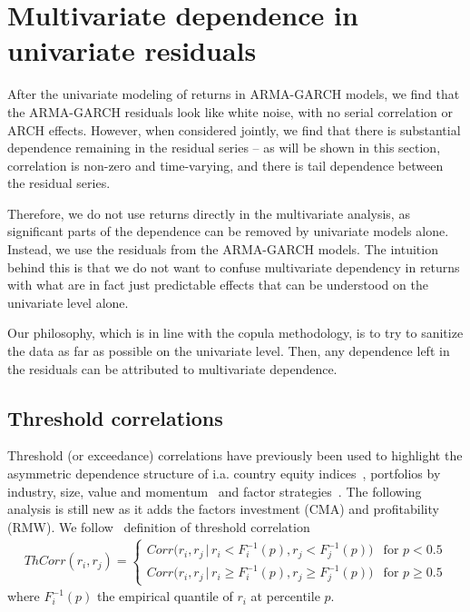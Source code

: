
\section{Multivariate dependence in univariate residuals} %
After the univariate modeling of returns in ARMA-GARCH models, we find that the ARMA-GARCH residuals look like white noise, with no serial correlation or ARCH effects. However, when considered jointly, we find that there is substantial dependence remaining in the residual series -- as will be shown in this section, correlation is non-zero and time-varying, and there is tail dependence between the residual series. 

Therefore, we do not use returns directly in the multivariate analysis, as significant parts of the dependence can be removed by univariate models alone. Instead, we use the residuals from the ARMA-GARCH models. The intuition behind this is that we do not want to confuse multivariate dependency in returns with what are in fact just predictable effects that can be understood on the univariate level alone.

Our philosophy, which is in line with the copula methodology, is to try to sanitize the data as far as possible on the univariate level. Then, any dependence left in the residuals can be attributed to multivariate dependence.

\subsection{Threshold correlations}
Threshold (or exceedance) correlations have previously been used to highlight the asymmetric dependence structure of i.a. country equity indices~\autocite{LonginSolnik2001}, portfolios by industry, size, value and momentum~\autocite{AngChen2002} and factor strategies~\autocite{ChristoffersenLanglois2013}. The following analysis is still new as it adds the factors investment (CMA) and profitability (RMW). We follow~\textcite{ChristoffersenLanglois2013} definition of threshold correlation
\begin{align}
    ThCorr(r_i, r_j) = 
    \begin{cases} 
        Corr\Big(r_i, r_j \,|\, r_i < F_i^{-1}(p), r_j < F_j^{-1}(p)\Big)  & \text{for } p < 0.5 \\
        Corr\Big(r_i, r_j \,|\, r_i \geq F_i^{-1}(p), r_j \geq F_j^{-1}(p)\Big)  & \text{for } p \geq 0.5
    \end{cases}
\end{align}
where $F_i^{-1}(p)$ the empirical quantile of $r_i$ at percentile $p$. 

